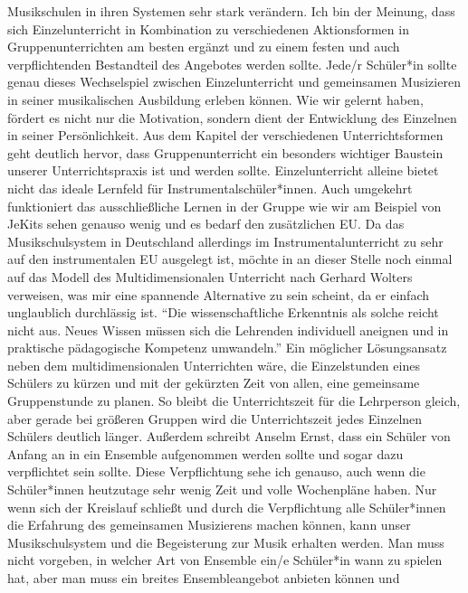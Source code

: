 Musikschulen in ihren Systemen sehr stark verändern. Ich bin der Meinung, dass
sich Einzelunterricht in Kombination zu verschiedenen Aktionsformen in
Gruppenunterrichten am besten ergänzt und zu einem festen und auch
verpflichtenden Bestandteil des Angebotes werden sollte. Jede/r Schüler*in
sollte genau dieses Wechselspiel zwischen Einzelunterricht und gemeinsamen
Musizieren in seiner musikalischen Ausbildung erleben können. Wie wir gelernt
haben, fördert es nicht nur die Motivation, sondern dient der Entwicklung des
Einzelnen in seiner Persönlichkeit. Aus dem Kapitel der verschiedenen
Unterrichtsformen geht deutlich hervor, dass Gruppenunterricht ein besonders
wichtiger Baustein unserer Unterrichtspraxis ist und werden sollte.
Einzelunterricht alleine bietet nicht das ideale Lernfeld für
Instrumentalschüler*innen. Auch umgekehrt funktioniert das ausschließliche Lernen in
der Gruppe wie wir am Beispiel von JeKits sehen genauso wenig und es bedarf den
zusätzlichen EU. Da das Musikschulsystem in Deutschland allerdings im
Instrumentalunterricht zu sehr auf den instrumentalen EU ausgelegt ist, möchte
in an dieser Stelle noch einmal auf das Modell des Multidimensionalen Unterricht
nach Gerhard Wolters verweisen, was mir eine spannende Alternative zu sein
scheint, da er einfach unglaublich durchlässig ist.
\enquote{Die wissenschaftliche Erkenntnis als solche reicht nicht aus. Neues
Wissen müssen sich die Lehrenden individuell aneignen und in praktische
pädagogische Kompetenz umwandeln.}
\autocite[10]{losert:die_kunst_zu_unterrichten} Ein möglicher Lösungsansatz
neben dem multidimensionalen Unterrichten wäre, die Einzelstunden eines Schülers
zu kürzen und mit der gekürzten Zeit von allen, eine gemeinsame Gruppenstunde zu
planen. So bleibt die Unterrichtszeit für die Lehrperson gleich, aber gerade bei
größeren Gruppen wird die Unterrichtszeit jedes Einzelnen Schülers deutlich
länger.\autocite[33]{losert:die_kunst_zu_unterrichten} Außerdem schreibt Anselm
Ernst, dass ein Schüler von Anfang an in ein Ensemble aufgenommen werden sollte
und sogar dazu verpflichtet sein sollte.
\autocite[61]{ernst:die_zukunftsfaehige_musikschule} Diese Verpflichtung sehe
ich genauso, auch wenn die Schüler*innen heutzutage sehr wenig Zeit und volle
Wochenpläne haben. Nur wenn sich der Kreislauf schließt und durch die
Verpflichtung alle Schüler*innen die Erfahrung des gemeinsamen Musizierens machen
können, kann unser Musikschulsystem und die Begeisterung zur Musik erhalten
werden. Man muss nicht vorgeben, in welcher Art von Ensemble ein/e Schüler*in wann zu
spielen hat, aber man muss ein breites Ensembleangebot anbieten können und
